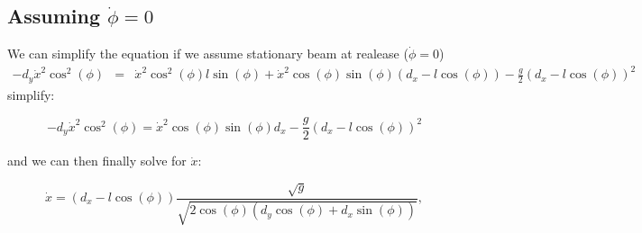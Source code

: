 \subsection{Assuming $\dot{\phi}=0$}

We can simplify the equation if we assume stationary beam at realease
($\dot{\phi}=0$) 
\begin{eqnarray*}
-d_{y}\dot{x}^{2}\cos^{2}(\phi) & = & \dot{x}^{2}\cos^{2}(\phi)l\sin(\phi)+\dot{x}^{2}\cos(\phi)\sin(\phi)\left(d_{x}-l\cos(\phi)\right)-\frac{g}{2}\left(d_{x}-l\cos(\phi)\right)^{2}
\end{eqnarray*}
simplify:

\[
-d_{y}\dot{x}^{2}\cos^{2}(\phi)=\dot{x}^{2}\cos(\phi)\sin(\phi)d_{x}-\frac{g}{2}\left(d_{x}-l\cos(\phi)\right)^{2}
\]


and we can then finally solve for $\dot{x}$:

\[
\dot{x}=\left(d_{x}-l\cos(\phi)\right)\frac{\sqrt{g}}{\sqrt{2\cos(\phi)\left(d_{y}\cos(\phi)+d_{x}\sin(\phi)\right)}},
\]